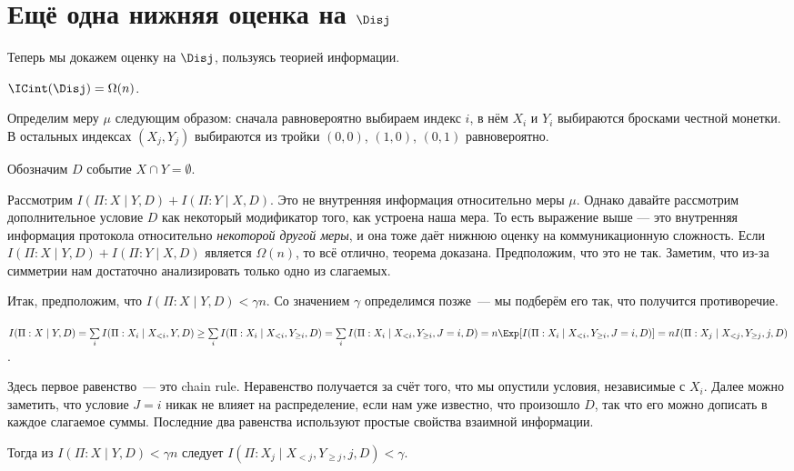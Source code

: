 \section{Ещё одна нижняя оценка на $\Disj$}

Теперь мы докажем оценку на $\Disj$, пользуясь теорией информации.

\begin{theorem}
    $\ICint(\Disj) = \Omega(n)$.
\end{theorem}

Определим меру $\mu$ следующим образом: сначала равновероятно выбираем индекс $i$, в нём $X_i$ и $Y_i$
выбираются бросками честной монетки. В остальных индексах $(X_j, Y_j)$ выбираются из тройки $(0, 0)$,
$(1, 0)$, $(0, 1)$ равновероятно.

Обозначим $D$ событие $X \cap Y = \emptyset$.

Рассмотрим $I(\Pi : X \mid Y, D) + I(\Pi : Y \mid X, D)$. Это не внутренняя информация относительно меры
$\mu$. Однако давайте рассмотрим дополнительное условие $D$ как некоторый модификатор того, как устроена
наша мера. То есть выражение выше --- это внутренняя информация протокола относительно \textit{некоторой
    другой меры}, и она тоже даёт нижнюю оценку на коммуникационную сложность. Если $I(\Pi : X \mid Y, D)
+ I(\Pi : Y \mid X, D)$ является $\Omega(n)$, то всё отлично, теорема доказана. Предположим, что это не
так. Заметим, что из-за симметрии нам достаточно анализировать только одно из слагаемых.

Итак, предположим, что $I(\Pi : X \mid Y, D) < \gamma n$. Со значением $\gamma$ определимся позже~--- мы
подберём его так, что получится противоречие.

$I(\Pi : X \mid Y, D) = \sum\limits_i I(\Pi : X_i \mid X_{< i}, Y, D) \ge \sum\limits_i I(\Pi : X_i \mid
X_{< i}, Y_{\geq i}, D) = \sum\limits_i I(\Pi : X_i \mid X_{< i}, Y_{\ge i}, J = i, D) = n \Exp[I(\Pi :
X_i \mid X_{< i}, Y_{\ge i}, J = i, D)] = n I(\Pi : X_j \mid X_{< j}, Y_{\ge j}, j, D)$.

Здесь первое равенство~--- это chain rule. Неравенство получается за счёт того, что мы опустили условия,
независимые с $X_i$. Далее можно заметить, что условие $J = i$ никак не влияет на распределение, если нам
уже известно, что произошло $D$, так что его можно дописать в каждое слагаемое суммы. Последние два
равенства используют простые свойства взаимной информации.

Тогда из $I(\Pi : X \mid Y, D) < \gamma n$ следует $I(\Pi : X_j \mid X_{< j}, Y_{\geq j}, j, D) < \gamma$.

